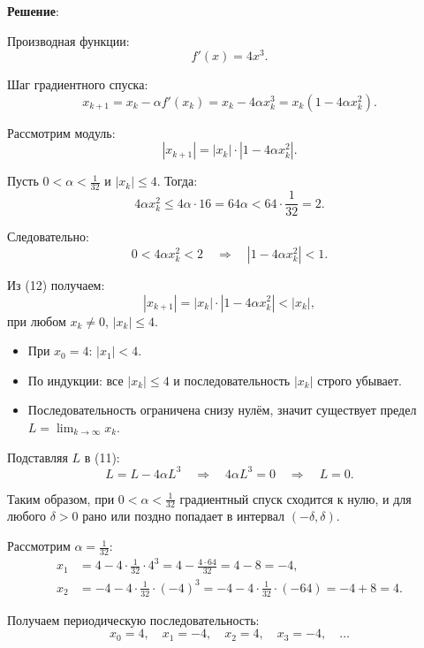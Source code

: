 \documentclass[pract]{SCWorks}
\begin{document}
    \textbf{Решение}:

    Производная функции:
    \[
    f'(x) = 4x^3.
    \]

    Шаг градиентного спуска:
    \begin{equation}
    x_{k+1} = x_k - \alpha f'(x_k) = x_k - 4\alpha x_k^3 = x_k(1 - 4\alpha x_k^2).
    \end{equation}

    Рассмотрим модуль:
    \begin{equation}
    |x_{k+1}| = |x_k| \cdot |1 - 4\alpha x_k^2|.
    \end{equation}

    Пусть $0 < \alpha < \frac{1}{32}$ и $|x_k| \le 4$.
    Тогда:
    \[
    4\alpha x_k^2 \le 4\alpha \cdot 16 = 64\alpha < 64 \cdot \frac{1}{32} = 2.
    \]

    Следовательно:
    \[
    0 < 4\alpha x_k^2 < 2 \quad \Rightarrow \quad |1 - 4\alpha x_k^2| < 1.
    \]

    Из (12) получаем:
    \[
    |x_{k+1}| = |x_k| \cdot |1 - 4\alpha x_k^2| < |x_k|,
    \]
    при любом $x_k \neq 0$, $|x_k| \le 4$.

    \begin{itemize}
        \item[$\bullet$] При $x_0 = 4$: $|x_1| < 4$.
        \item[$\bullet$] По индукции: все $|x_k| \le 4$ и последовательность $|x_k|$ строго убывает.
        \item[$\bullet$] Последовательность ограничена снизу нулём, значит существует предел $L = \lim_{k \to \infty} x_k$.
    \end{itemize}

    Подставляя $L$ в (11):
    \[
    L = L - 4\alpha L^3 \quad \Rightarrow \quad 4\alpha L^3 = 0 \quad \Rightarrow \quad L = 0.
    \]

    Таким образом, при $0 < \alpha < \frac{1}{32}$ градиентный спуск сходится к нулю, и для любого $\delta > 0$ рано или поздно попадает в интервал $(-\delta, \delta)$.

    Рассмотрим $\alpha = \frac{1}{32}$:
    \[
    \begin{aligned}
    x_1 &= 4 - 4 \cdot \frac{1}{32} \cdot 4^3 = 4 - \frac{4 \cdot 64}{32} = 4 - 8 = -4, \\[4pt]
    x_2 &= -4 - 4 \cdot \frac{1}{32} \cdot (-4)^3 = -4 - 4 \cdot \frac{1}{32} \cdot (-64) = -4 + 8 = 4.
    \end{aligned}
    \]

    Получаем периодическую последовательность:
    \[
    x_0 = 4,\quad x_1 = -4,\quad x_2 = 4,\quad x_3 = -4,\quad \dots
    \]
\end{document}
